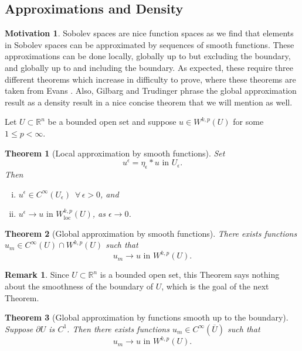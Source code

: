 \documentclass[11pt]{article}
\newtheorem{theorem}{Theorem}
\theoremstyle{definition}
\newtheorem*{remark}{Remark}
\newtheorem*{motivation}{Motivation}
\begin{document}
\subsection{Approximations and Density}
\begin{motivation}
Sobolev spaces are nice function spaces as we find that elements in Sobolev spaces can be approximated by sequences of smooth functions.
These approximations can be done locally, globally up to but excluding the boundary, and globally up to and including the boundary.
As expected, these require three different theorems which increase in difficulty to prove, where these theorems are taken from Evans \cite{evans1998partial}.
Also, Gilbarg and Trudinger \cite{gilbarg2001elliptic} phrase the global approximation result as a density result in a nice concise theorem that we will mention as well.
\end{motivation}
Let $U \subset \mathbb{R}^n$ be a bounded open set and suppose $u \in W^{k,p}(U)$ for some $1 \leq p < \infty$.
\begin{theorem}[Local approximation by smooth functions]
Set
	\[u^{\epsilon} = \eta_{\epsilon} * u \text{ in } U_{\epsilon}.\]
Then
	\begin{enumerate}[(i)]
		\item $u^{\epsilon} \in C^{\infty}(U_{\epsilon}) \,\,\, \forall \, \epsilon > 0$, and
		\item $u^{\epsilon} \rightarrow u \text{ in } W_{\text{loc}}^{k,p}(U)$, as $\epsilon \rightarrow 0$.
	\end{enumerate}
\end{theorem}

\begin{theorem}[Global approximation by smooth functions]
	There exists functions $u_m \in C^{\infty}(U)\cap W^{k,p}(U)$ such that
	\[u_m \rightarrow u \text{ in } W^{k,p}(U).\]
\end{theorem}

\begin{remark}
Since $U \subset \mathbb{R}^n$ is a bounded open set, this Theorem says
nothing about the smoothness of the boundary of $U$, which is the goal of the next Theorem.
\end{remark}

\begin{theorem}[Global approximation by functions smooth up to the boundary]
	Suppose $\partial U$ is $C^1$.
	Then there exists functions $u_m \in C^{\infty}(\overline{U})$ such that
	\[u_m \rightarrow u \text{ in } W^{k,p}(U).\]
\end{theorem}
\end{document}
